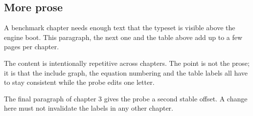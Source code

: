 \subsection{More prose}
A benchmark chapter needs enough text that the type\-set is visible above the
engine boot. This paragraph, the next one and the table above add up to a few
pages per chapter.

The content is intentionally repetitive across chapters. The point is not the
prose; it is that the include graph, the equation numbering and the table
labels all have to stay consistent while the probe edits one letter.

The final paragraph of chapter 3 gives the probe a second stable offset. A
change here must not invalidate the labels in any other chapter.
